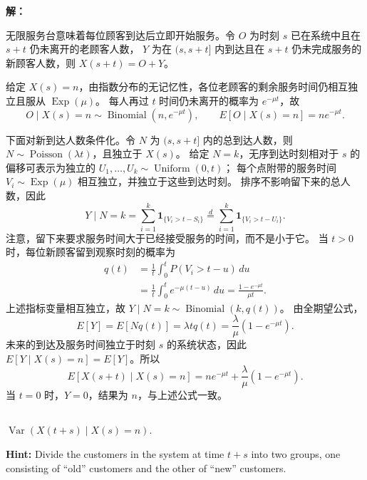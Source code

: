 \documentclass[12pt,a4paper]{article}
\begin{document}
\begin{answerbox}
\textbf{解：}

无限服务台意味着每位顾客到达后立即开始服务。令 $O$ 为时刻 $s$ 已在系统中且在 $s+t$ 仍未离开的老顾客人数，
$Y$ 为在 $(s,s+t]$ 内到达且在 $s+t$ 仍未完成服务的新顾客人数，则 $X(s+t)=O+Y$。

给定 $X(s)=n$，由指数分布的无记忆性，各位老顾客的剩余服务时间仍相互独立且服从 $\operatorname{Exp}(\mu)$。
每人再过 $t$ 时间仍未离开的概率为 $e^{-\mu t}$，故
$$
O\mid X(s)=n\sim\operatorname{Binomial}(n,e^{-\mu t}),
\qquad E[O\mid X(s)=n]=ne^{-\mu t}.
$$

下面对新到达人数条件化。令 $N$ 为 $(s,s+t]$ 内的总到达人数，则 $N\sim\operatorname{Poisson}(\lambda t)$，且独立于 $X(s)$。
给定 $N=k$，无序到达时刻相对于 $s$ 的偏移可表示为独立的 $U_1,\ldots,U_k\sim\operatorname{Uniform}(0,t)$；
每个点附带的服务时间 $V_i\sim\operatorname{Exp}(\mu)$ 相互独立，并独立于这些到达时刻。
排序不影响留下来的总人数，因此
$$
Y\mid N=k = \sum_{i=1}^k\mathbf{1}_{\{V_i>t-S_i\}} \overset{d}{=}\sum_{i=1}^k\mathbf{1}_{\{V_i>t-U_i\}}.
$$
注意，留下来要求服务时间大于已经接受服务的时间，而不是小于它。
当 $t>0$ 时，每位新顾客留到观察时刻的概率为
$$
\begin{aligned}
q(t)&=\frac1t\int_0^t P(V_i>t-u)\,du\\
&=\frac1t\int_0^t e^{-\mu(t-u)}\,du
=\frac{1-e^{-\mu t}}{\mu t}.
\end{aligned}
$$
上述指标变量相互独立，故 $Y\mid N=k\sim\operatorname{Binomial}(k,q(t))$。
由全期望公式，
$$
E[Y]=E[Nq(t)]=\lambda t q(t)=\frac{\lambda}{\mu}(1-e^{-\mu t}).
$$
未来的到达及服务时间独立于时刻 $s$ 的系统状态，因此 $E[Y\mid X(s)=n]=E[Y]$。所以
$$
E[X(s+t)\mid X(s)=n]
=ne^{-\mu t}+\frac{\lambda}{\mu}(1-e^{-\mu t}).
$$
当 $t=0$ 时，$Y=0$，结果为 $n$，与上述公式一致。

\end{answerbox}


\subsection{}

$\operatorname{Var}(X(t+s) \mid X(s)=n)$.

\noindent\textbf{Hint:} Divide the customers in the system at time $t+s$ into two groups, one consisting of “old” customers and the other of “new” customers.
\end{document}
